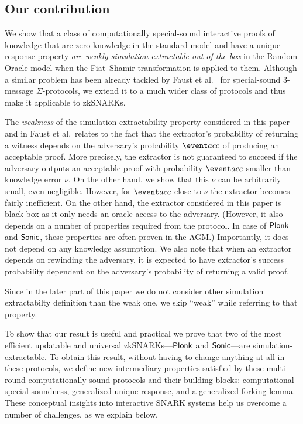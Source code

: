 \documentclass[runningheads,11pt]{llncs}
\theoremstyle{definition} \newtheorem{definition}[theorem]{Definition}
\begin{document}
\subsection{Our contribution}
We show that a class of computationally special-sound interactive proofs of
knowledge that are zero-knowledge 
in the standard model and have a unique response property \emph{are weakly
  simulation-extractable out-of-the box} in the Random Oracle model when the
Fiat--Shamir transformation is applied to them. Although a similar problem has
been already tackled by Faust et al.~\cite{INDOCRYPT:FKMV12} for special-sound
$3$-message $\Sigma$-protocols, we extend it to a much wider class of protocols
and thus make it applicable to zkSNARKs.

The \emph{weakness} of the simulation extractability property considered in this
paper and in Faust et al.~relates to the fact that the extractor's probability
of returning a witness depends on the adversary's probability $\accProb$ of
producing an acceptable proof. More precisely, the extractor is not guaranteed
to succeed if the adversary outputs an acceptable proof with probability
$\accProb$ smaller than knowledge error $\nu$. On the other hand, we show that
this $\nu$ can be arbitrarily small, even negligible. However, for $\accProb$
close to $\nu$ the extractor becomes fairly inefficient. On the other hand, the
extractor considered in this paper is black-box as it only needs an oracle
access to the adversary. (However, it also depends on a number of properties
required from the protocol. In case of $\textnormal{\textsf{Plonk}}$ and ${\textnormal{\textsf{Sonic}}}$, these properties
are often proven in the AGM.)  Importantly, it does not depend on any knowledge
assumption. We also note that when an extractor depends on rewinding the
adversary, it is expected to have extractor's success probability dependent on
the adversary's probability of returning a valid proof.

Since in the later part of this paper we do not consider other simulation
extractabilty definition than the weak one, we skip ``weak'' while referring to
that property.

To show that our result is useful and practical we prove that two of the most
efficient updatable and universal zkSNARKs---$\textnormal{\textsf{Plonk}}$ and ${\textnormal{\textsf{Sonic}}}$---are
simulation-extractable. To obtain this result, without having to change anything
at all in these protocols, we define new intermediary properties satisfied by
these multi-round computationally sound protocols and their building blocks:
computational special soundness, generalized unique response, and a generalized
forking lemma. These conceptual insights into interactive SNARK systems help us
overcome a number of challenges, as we explain below.
\end{document}
